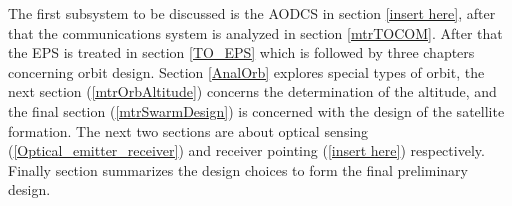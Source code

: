 \label{IntroTradeOff}

The first subsystem to be discussed is the \acs{AODCS} in section \ref{insert here}, after that the communications system is analyzed in section \ref{mtrTOCOM}. After that the \ac{EPS} is treated in section \ref{TO_EPS} which is followed by three chapters concerning orbit design. Section \ref{AnalOrb} explores special types of orbit, the next section (\ref{mtrOrbAltitude}) concerns the determination of the altitude, and the final section (\ref{mtrSwarmDesign}) is concerned with the design of the satellite formation. The next two sections are about optical sensing (\ref{Optical_emitter_receiver}) and receiver pointing (\ref{insert here}) respectively. Finally section summarizes the design choices to form the final preliminary design.